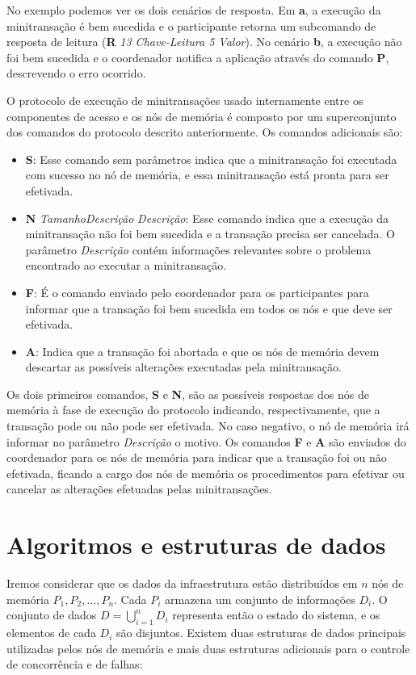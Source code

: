 \documentclass[11pt,twoside,a4paper]{book}
\begin{document}
No exemplo podemos ver os dois cenários de resposta. Em \textbf{a}, a execução da minitransação é bem sucedida e o participante retorna um subcomando de resposta de leitura (\textbf{R} \textit{13 Chave-Leitura 5 Valor}). 
No cenário \textbf{b}, a execução não foi bem sucedida e o coordenador notifica a aplicação através do comando \textbf{P}, descrevendo o erro ocorrido.

O protocolo de execução de minitransações usado internamente entre os componentes de acesso e os nós de memória é composto por um superconjunto dos comandos do protocolo descrito anteriormente. Os comandos adicionais são:

\begin{itemize}
    \item \textbf{S}: Esse comando sem parâmetros indica que a minitransação foi executada com sucesso no nó de memória, e essa minitransação está pronta para ser efetivada.

    \item \textbf{N} \textit{TamanhoDescrição} \textit{Descrição}: Esse comando indica que a execução da minitransação não foi bem sucedida e a transação precisa ser cancelada. O parâmetro \textit{Descrição} contém informações relevantes sobre o problema encontrado ao executar a minitransação.

    \item \textbf{F}: É o comando enviado pelo coordenador para os participantes para informar que a transação foi bem sucedida em todos os nós e que deve ser efetivada.

    \item \textbf{A}: Indica que a transação foi abortada e que os nós de memória devem descartar as possíveis alterações executadas pela minitransação.
\end{itemize}

Os dois primeiros comandos, \textbf{S} e \textbf{N}, são as possíveis respostas dos nós de memória à fase de execução do protocolo indicando, respectivamente, que a transação pode ou não pode ser efetivada. No caso negativo, o nó de memória irá informar no parâmetro \textit{Descrição} o motivo. Os comandos \textbf{F} e \textbf{A} são enviados do coordenador para os nós de memória para indicar que a transação foi ou não efetivada, ficando a cargo dos nós de memória os procedimentos para efetivar ou cancelar as alterações efetuadas pelas minitransações.

\section{Algoritmos e estruturas de dados}
\label{sec:algoritmos}
Iremos considerar que os dados da infraestrutura estão distribuídos em $n$ nós de memória $P_1, P_2, \dotsc, P_n$. Cada $P_i$ armazena um conjunto de informações $D_i$. O conjunto de dados $D = \bigcup_{i=1}^n D_i$ representa então o estado do sistema, e os elementos de cada $D_i$ são disjuntos. Existem duas estruturas de dados principais utilizadas pelos nós de memória e mais duas estruturas adicionais para o controle de concorrência e de falhas:
\end{document}
